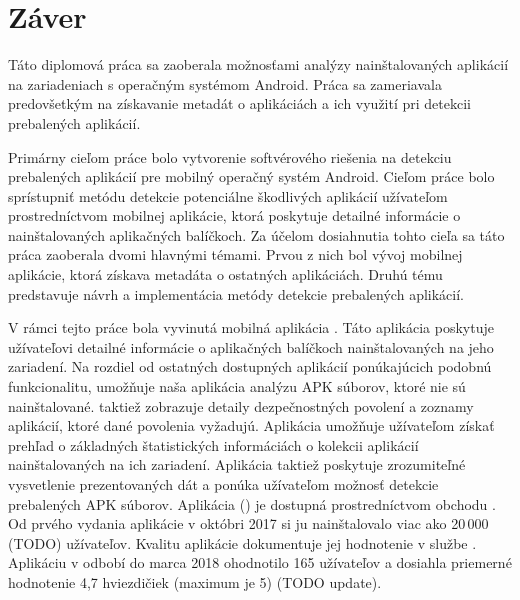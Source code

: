 \chapter*{Záver}
Táto diplomová práca sa zaoberala možnosťami analýzy nainštalovaných aplikácií na zariadeniach s operačným systémom Android. Práca sa zameriavala predovšetkým na získavanie metadát o aplikáciách a ich využití pri detekcii prebalených aplikácií.

Primárny cieľom práce bolo vytvorenie softvérového riešenia na detekciu prebalených aplikácií pre mobilný operačný systém Android. Cieľom práce bolo sprístupniť metódu detekcie potenciálne škodlivých aplikácií užívateľom prostredníctvom mobilnej aplikácie, ktorá poskytuje detailné informácie o nainštalovaných aplikačných balíčkoch.  
Za účelom dosiahnutia tohto cieľa sa táto práca zaoberala dvomi hlavnými témami. Prvou z nich bol vývoj mobilnej aplikácie, ktorá získava metadáta o ostatných aplikáciách. Druhú tému predstavuje návrh a implementácia metódy detekcie prebalených aplikácií. 

V rámci tejto práce bola vyvinutá mobilná aplikácia . Táto aplikácia poskytuje užívateľovi detailné informácie o aplikačných balíčkoch nainštalovaných na jeho zariadení. Na rozdiel od ostatných dostupných aplikácií ponúkajúcich podobnú funkcionalitu, umožňuje naša aplikácia analýzu APK súborov, ktoré nie sú nainštalované. taktiež zobrazuje detaily dezpečnostných povolení a zoznamy aplikácií, ktoré dané povolenia vyžadujú. Aplikácia umožňuje užívateľom získať prehľad o základných štatistických informáciách o kolekcii aplikácií nainštalovaných na ich zariadení. Aplikácia taktiež poskytuje zrozumiteľné vysvetlenie prezentovaných dát a ponúka užívateľom možnosť detekcie prebalených APK súborov.  Aplikácia  () je dostupná prostredníctvom obchodu . Od prvého vydania aplikácie v októbri 2017 si ju nainštalovalo viac ako 20\,000 (TODO) užívateľov. Kvalitu aplikácie dokumentuje jej hodnotenie v službe . Aplikáciu v odbobí do marca 2018 ohodnotilo 165 užívateľov a dosiahla priemerné hodnotenie 4,7 hviezdičiek (maximum je 5) (TODO update).

